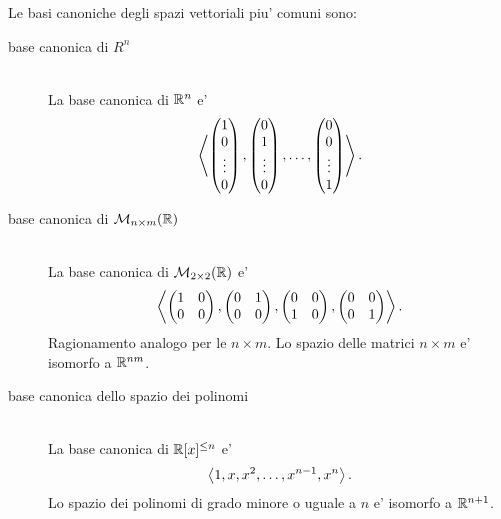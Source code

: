 Le basi canoniche degli spazi vettoriali piu' comuni sono:
\begin{description}
    \item[base canonica di $R^n$] \hfill \\La base canonica di $\mathbb{R}^n$ e' \[
        \left\langle \begin{pmatrix}
            1 \\ 0 \\ \vdots \\ 0
        \end{pmatrix}, \begin{pmatrix}
            0 \\ 1 \\ \vdots \\ 0
        \end{pmatrix}, \dots, \begin{pmatrix}
            0 \\ 0 \\ \vdots \\ 1
        \end{pmatrix} \right\rangle.  
    \] 
    \item[base canonica di $\mathcal{M}_{n \times m}(\mathbb{R})$] \hfill \\La base canonica di $\mathcal{M}_{2 \times 2}(\mathbb{R})$ e' \[
        \left\langle \begin{pmatrix}
            1 & 0 \\ 0 & 0
        \end{pmatrix}, \begin{pmatrix}
            0 & 1 \\ 0 & 0
        \end{pmatrix}, \begin{pmatrix}
            0 & 0 \\ 1 & 0
        \end{pmatrix}, \begin{pmatrix}
            0 & 0 \\ 0 & 1
        \end{pmatrix} \right\rangle.  
    \] Ragionamento analogo per le $n \times m$. Lo spazio delle matrici $n \times m$ e' isomorfo a $\mathbb{R}^{nm}$.
    \item[base canonica dello spazio dei polinomi] \hfill \\
    La base canonica di $\mathbb{R}[x]^{\leq n}$ e' \[
        \left\langle 1, x, x^2, \dots, x^{n-1}, x^n \right\rangle.  
    \] 
    Lo spazio dei polinomi di grado minore o uguale a $n$ e' isomorfo a $\mathbb{R}^{n+1}$.
\end{description}

